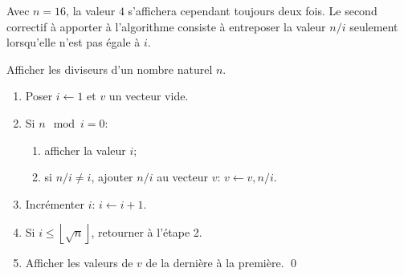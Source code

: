 \begin{exercice}
\begin{sol}
\begin{enumerate}
      Avec $n = 16$, la valeur $4$ s'affichera cependant toujours deux
      fois. Le second correctif à apporter à l'algorithme consiste à
      entreposer la valeur $n/i$ seulement lorsqu'elle n'est pas égale
      à $i$. %
      \begingroup %
      \addtocounter{algorithme}{-1}
      \renewcommand{\thealgorithme}{\Alph{algorithme}''}
      \begin{algorithme}
        Afficher les diviseurs d'un nombre naturel $n$.
        \begin{enumerate}[1.]
        \item Poser $i \leftarrow 1$ et $v$ un vecteur vide.
        \item Si $n \mod i = 0$:
          \begin{enumerate}[{2}.1,leftmargin=2em]
          \item afficher la valeur $i$;
          \item si $n/i \neq i$, ajouter $n/i$ au vecteur $v$:
            $v \leftarrow v, n/i$.
          \end{enumerate}
        \item Incrémenter $i$: $i \leftarrow i + 1$.
        \item Si $i \leq \left\lfloor \sqrt{n} \right\rfloor$,
          retourner à l'étape 2.
        \item Afficher les valeurs de $v$ de la dernière à la
          première.
          \qed
        \end{enumerate}
      \end{algorithme}
      \endgroup %
    \end{enumerate}
  \end{sol}
\end{exercice}

